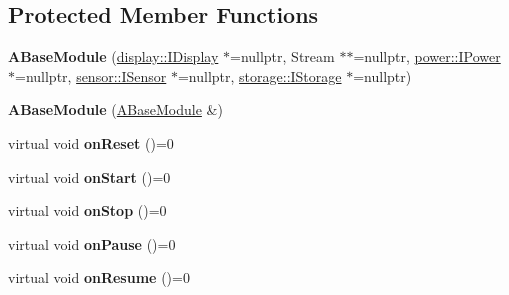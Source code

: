 \subsection*{Protected Member Functions}
\begin{DoxyCompactItemize}
\item 
\mbox{\label{classwood_box_1_1module_1_1_a_base_module_a40edd799ba7342abfaf5cb06e60a4b04}} 
{\bfseries A\+Base\+Module} (\mbox{\hyperlink{classwood_box_1_1display_1_1_i_display}{display\+::\+I\+Display}} $\ast$=nullptr, Stream $\ast$$\ast$=nullptr, \mbox{\hyperlink{classwood_box_1_1power_1_1_i_power}{power\+::\+I\+Power}} $\ast$=nullptr, \mbox{\hyperlink{classwood_box_1_1sensor_1_1_i_sensor}{sensor\+::\+I\+Sensor}} $\ast$=nullptr, \mbox{\hyperlink{classwood_box_1_1storage_1_1_i_storage}{storage\+::\+I\+Storage}} $\ast$=nullptr)
\item 
\mbox{\label{classwood_box_1_1module_1_1_a_base_module_aed2f16158b239a6ad450f3a522809644}} 
{\bfseries A\+Base\+Module} (\mbox{\hyperlink{classwood_box_1_1module_1_1_a_base_module}{A\+Base\+Module}} \&)
\item 
\mbox{\label{classwood_box_1_1module_1_1_a_base_module_a393bee87aaac25c40a7991c9aee5718a}} 
virtual void {\bfseries on\+Reset} ()=0
\item 
\mbox{\label{classwood_box_1_1module_1_1_a_base_module_a7ae47c5d0da877569df890936a93e488}} 
virtual void {\bfseries on\+Start} ()=0
\item 
\mbox{\label{classwood_box_1_1module_1_1_a_base_module_a86ca0e43cfbd4c515cbe02ff42f1737e}} 
virtual void {\bfseries on\+Stop} ()=0
\item 
\mbox{\label{classwood_box_1_1module_1_1_a_base_module_a146eee2d0977546e0fed7bcf5135a8db}} 
virtual void {\bfseries on\+Pause} ()=0
\item 
\mbox{\label{classwood_box_1_1module_1_1_a_base_module_ad0d6ad896184c9966fec33b1f349606b}} 
virtual void {\bfseries on\+Resume} ()=0
$$
\end{DoxyCompactItemize}
